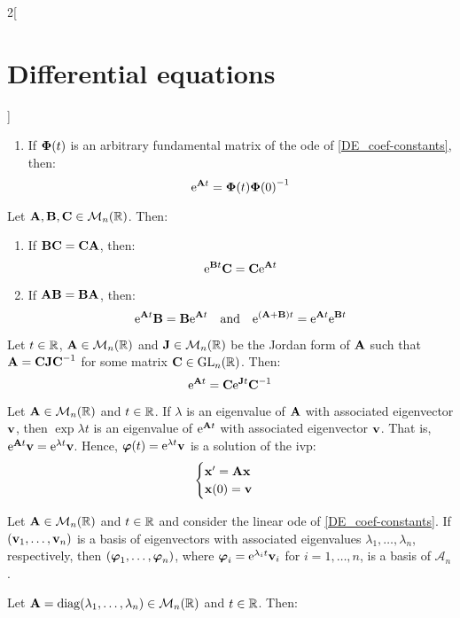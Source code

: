 \documentclass[../../../main.tex]{subfiles}
\begin{document}
\begin{multicols}{2}[\section{Differential equations}]
\begin{proposition}
\begin{enumerate}
      \item If $\vf{\Phi}(t)$ is an arbitrary fundamental matrix of the ode of \cref{DE_coef-constants}, then: $$\exp{\vf{A}t}=\vf{\Phi}(t){\vf{\Phi}(0)}^{-1}$$
    \end{enumerate}
  \end{proposition}
  \begin{lemma}
    Let $\vf{A},\vf{B},\vf{C}\in\mathcal{M}_n(\RR)$. Then:
    \begin{enumerate}
      \item If $\vf{B}\vf{C}=\vf{C}\vf{A}$, then: $$\exp{\vf{B}t}\vf{C}=\vf{C}\exp{\vf{A}t}$$
      \item If $\vf{A}\vf{B}=\vf{B}\vf{A}$, then: $$\exp{\vf{A}t}\vf{B}=\vf{B}\exp{\vf{A}t}\quad\text{and}\quad\exp{(\vf{A}+\vf{B})t}=\exp{\vf{A}t}\exp{\vf{B}t}$$
    \end{enumerate}
  \end{lemma}
  \begin{corollary}
    Let $t\in\RR$, $\vf{A}\in\mathcal{M}_n(\RR)$ and $\vf{J}\in\mathcal{M}_n(\RR)$ be the Jordan form of $\vf{A}$ such that $\vf{A}=\vf{C}\vf{J}\vf{C}^{-1}$ for some matrix $\vf{C}\in\GL_n(\RR)$. Then: $$\exp{\vf{A}t}=\vf{C}\exp{\vf{J}t}\vf{C}^{-1}$$
  \end{corollary}
  \begin{proposition}
    Let $\vf{A}\in\mathcal{M}_n(\RR)$ and $t\in\RR$. If $\lambda$ is an eigenvalue of $\vf{A}$ with associated eigenvector $\vf{v}$, then $\exp{\lambda t}$ is an eigenvalue of $\exp{\vf{A}t}$ with associated eigenvector $\vf{v}$. That is, $\exp{\vf{A}t}\vf{v}=\exp{\lambda t}\vf{v}$. Hence, $\vf{\varphi}(t)=\exp{\lambda t}\vf{v}$ is a solution of the ivp:
    $$
      \begin{cases}
        \vf{x}'      =\vf{A}\vf{x} \\
        \vf{x}(0)  =\vf{v}
      \end{cases}
    $$
  \end{proposition}
  \begin{corollary}
    Let $\vf{A}\in\mathcal{M}_n(\RR)$ and $t\in\RR$ and consider the linear ode of \cref{DE_coef-constants}. If $(\vf{v}_1,\ldots,\vf{v}_n)$ is a basis of eigenvectors with associated eigenvalues $\lambda_1,\ldots,\lambda_n$, respectively, then $(\vf{\varphi}_1,\ldots,\vf{\varphi}_n)$, where $\vf{\varphi}_i=\exp{\lambda_it}\vf{v}_i$ for $i=1,\ldots,n$, is a basis of $\mathcal{A}_n$.
  \end{corollary}
  \begin{lemma}
    Let $\vf{A}=\diag(\lambda_1,\ldots,\lambda_n)\in\mathcal{M}_n(\RR)$ and $t\in\RR$. Then:

\end{lemma}
\end{multicols}
\end{document}

